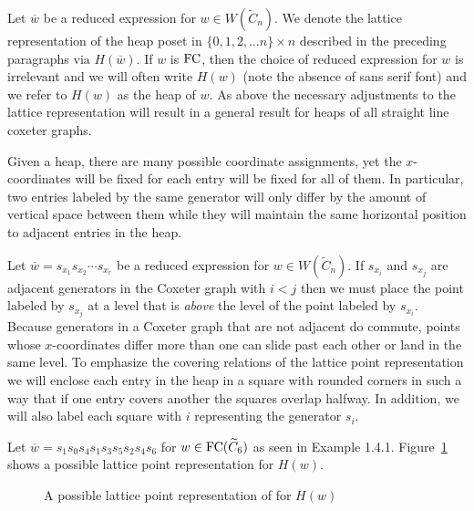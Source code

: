 Let $\overline{w}$ be a reduced expression for $w \in W(\widetilde{C}_n)$. We denote the lattice representation of the heap poset in $\{0,1,2, \ldots n\} \times n$ described in the preceding paragraphs via $H(\overline{w})$. If $w$ is $\mathrm{FC}$, then the choice of reduced expression for $w$ is irrelevant and we will often write $H(w)$ (note the absence of \textsf{sans serif} font) and we refer to $H(w)$ as the heap of $w$. As above the necessary adjustments to the lattice representation will result in a general result for heaps of all straight line coxeter graphs.

Given a heap, there are many possible coordinate assignments, yet the $x$-coordinates will be fixed for each entry will be fixed for all of them. In particular, two entries labeled by the same generator will only differ by the amount of vertical space between them while they will maintain the same horizontal position to adjacent entries in the heap.

Let $\overline{w}=s_{x_1}s_{x_2}\cdots s_{x_r}$ be a reduced expression for $w \in W(\widetilde{C}_n)$. If $s_{x_i}$ and $s_{x_j}$ are adjacent generators in the Coxeter graph with $i<j$ then we must place the point labeled by $s_{x_j}$ at a level that is \emph{above} the level of the point labeled by $s_{x_i}$. Because generators in a Coxeter graph that are not adjacent do commute, points whose $x$-coordinates differ more than one can slide past each other or land in the same level. To emphasize the covering relations of the lattice point representation we will enclose each entry in the heap in a square with rounded corners in such a way that if one entry covers another the squares overlap halfway. In addition, we will also label each square with $i$ representing the generator $s_i$.

\begin{example}
	Let $\overline{w}=s_1s_0s_4s_1s_3s_5s_2s_4s_6$ for $w \in \mathrm{FC}(\widetilde{C}_6)$ as seen in Example 1.4.1. Figure~\ref{fig:FC heap} shows a possible lattice point representation for $H(w)$.
\begin{figure}[h]
\centering
{}
\caption{A possible lattice point representation of for $H(w)$}
\label{fig:FC heap}
\end{figure}
\end{example}

